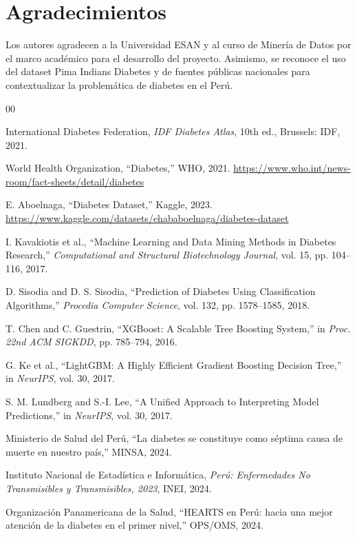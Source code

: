 \documentclass[conference]{IEEEtran}
\begin{document}
\section*{Agradecimientos}

Los autores agradecen a la Universidad ESAN y al curso de Minería de Datos por el marco académico para el desarrollo del proyecto. Asimismo, se reconoce el uso del dataset Pima Indians Diabetes y de fuentes públicas nacionales para contextualizar la problemática de diabetes en el Perú.

\begin{thebibliography}{00}

International Diabetes Federation, \textit{IDF Diabetes Atlas}, 10th ed., Brussels: IDF, 2021.

World Health Organization, ``Diabetes,'' WHO, 2021. \url{https://www.who.int/news-room/fact-sheets/detail/diabetes}

E. Aboelnaga, ``Diabetes Dataset,'' Kaggle, 2023. \url{https://www.kaggle.com/datasets/ehababoelnaga/diabetes-dataset}

I. Kavakiotis et al., ``Machine Learning and Data Mining Methods in Diabetes Research,'' \textit{Computational and Structural Biotechnology Journal}, vol. 15, pp. 104--116, 2017.

D. Sisodia and D. S. Sisodia, ``Prediction of Diabetes Using Classification Algorithms,'' \textit{Procedia Computer Science}, vol. 132, pp. 1578--1585, 2018.

T. Chen and C. Guestrin, ``XGBoost: A Scalable Tree Boosting System,'' in \textit{Proc. 22nd ACM SIGKDD}, pp. 785--794, 2016.

G. Ke et al., ``LightGBM: A Highly Efficient Gradient Boosting Decision Tree,'' in \textit{NeurIPS}, vol. 30, 2017.

S. M. Lundberg and S.-I. Lee, ``A Unified Approach to Interpreting Model Predictions,'' in \textit{NeurIPS}, vol. 30, 2017.

Ministerio de Salud del Perú, ``La diabetes se constituye como séptima causa de muerte en nuestro país,'' MINSA, 2024.

Instituto Nacional de Estadística e Informática, \textit{Perú: Enfermedades No Transmisibles y Transmisibles, 2023}, INEI, 2024.

Organización Panamericana de la Salud, ``HEARTS en Perú: hacia una mejor atención de la diabetes en el primer nivel,'' OPS/OMS, 2024.


\end{thebibliography}
\end{document}
